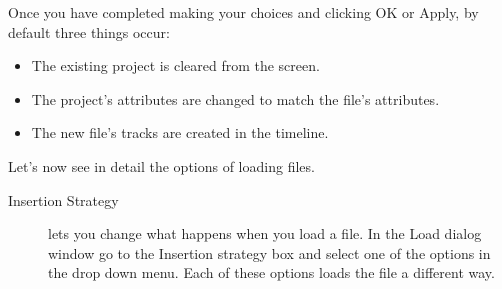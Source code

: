 \noindent Once you have completed making your choices and clicking OK or Apply, by default three things occur:

\begin{itemize}[noitemsep]
    \item The existing project is cleared from the screen.
    \item The project's attributes are changed to match the file's attributes.
    \item The new file's tracks are created in the timeline.
\end{itemize}

\noindent Let's now see in detail the options of loading files.

\begin{description}
    \item[Insertion Strategy] 
    \CGG{} lets you change what happens when you load a file.  In the Load dialog window go to the Insertion strategy box and select one of the options in the drop down menu. Each of these options loads the file a different way.
    

\end{description}
